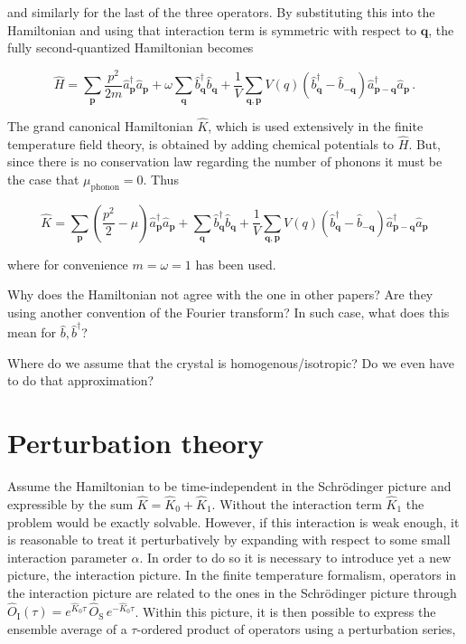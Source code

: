 \documentclass[12pt]{report}
\renewcommand{\vec}[1]{\boldsymbol{\mathbf{#1}}}                        %
\newcommand{\question}[1]{{\leavevmode\color{question}#1}}
\begin{document}
and similarly for the last of the three operators. By substituting this into the Hamiltonian and using that interaction term is symmetric with respect to $ \vec q $, the fully second-quantized Hamiltonian becomes

\begin{equation}
	\label{eq:finalHamiltonian}
	\hat H
	= \sum_{\vec p} \frac{p^2}{2m} \hat a^\dagger_{\vec p} \hat a_{\vec p}
	+ \omega \sum_{\vec q} \hat b^\dagger_{\vec q} \hat b_{\vec q}
	+ \frac{1}{V} \sum_{\vec q, \vec p} V (q) \left( \hat b^\dagger_{\vec q} - \hat b_{- \vec q} \right) \hat a^\dagger_{\vec p - \vec q} \hat a_{\vec p} \,.
\end{equation}

The grand canonical Hamiltonian $ \hat K $, which is used extensively in the finite temperature field theory, is obtained by adding chemical potentials to $ \hat H $. But, since there is no conservation law regarding the number of phonons it must be the case that $ \mu_\text{phonon} = 0 $. Thus

\begin{equation}
	\label{eq:finalGrandCanoniclaHamiltonian}
	\hat K
	= \sum_{\vec p} \left( \frac{p^2}{2} - \mu \right) \hat a^\dagger_{\vec p} \hat a_{\vec p}
	+ \sum_{\vec q} \hat b^\dagger_{\vec q} \hat b_{\vec q}
	+ \frac{1}{V} \sum_{\vec q, \vec p} V (q) \left( \hat b^\dagger_{\vec q} - \hat b_{- \vec q} \right) \hat a^\dagger_{\vec p - \vec q} \hat a_{\vec p}
\end{equation}

where for convenience $ m = \omega = 1 $ has been used.

\question{Why does the Hamiltonian not agree with the one in other papers? Are they using another convention of the Fourier transform? In such case, what does this mean for $ \hat b, \hat b^\dagger $?}

\question{Where do we assume that the crystal is homogenous/isotropic? Do we even have to do that approximation?}

\section{Perturbation theory}

Assume the Hamiltonian to be time-independent in the Schrödinger picture and expressible by the sum $ \hat K = \hat K_0 + \hat K_1 $. Without the interaction term $ \hat K_1 $ the problem would be exactly solvable. However, if this interaction is weak enough, it is reasonable to treat it perturbatively by expanding with respect to some small interaction parameter $ \alpha $. In order to do so it is necessary to introduce yet a new picture, the interaction picture. In the finite temperature formalism, operators in the interaction picture are related to the ones in the Schrödinger picture through $ \hat O_\text{I} (\tau) = e^{\hat K_0 \tau} \, \hat O_\text{S} \, e^{-\hat K_0 \tau} $. Within this picture, it is then possible to express the ensemble average of a $ \tau $-ordered product of operators using a perturbation series,
\end{document}
